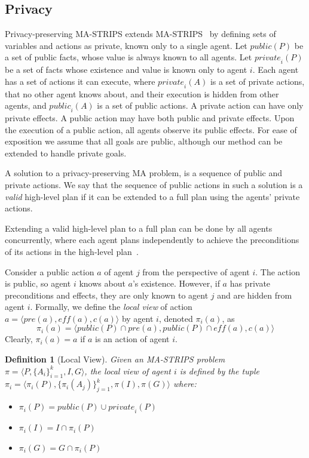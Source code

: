 \documentclass[letterpaper]{article}
\newcommand{\private}[2]{\textit{private}_{#1}(#2)}
\newcommand{\eff}{\textit{eff}}
\newcommand{\pre}{\textit{pre}}
\newcommand{\public}{\textit{public}}
\newtheorem{definition}{Definition}
\theoremstyle{definition}
\begin{document}
\subsection{Privacy}

Privacy-preserving MA-STRIPS extends MA-STRIPS~\cite{brafman2008one} by defining sets of variables and actions as private, known only to a single agent. Let $\public(P)$ be a set of public facts, whose value is always known to all agents. Let $\private{i}{P}$ be a set of facts whose existence and value is known only to agent $i$. Each agent has a set of actions it can execute, where $\private{i}{A}$ is a set of private actions, that no other agent knows about, and their execution is hidden from other agents, and $\public_i(A)$ is a set of public actions. A private action can have only private effects. A public action may have both public and private effects. Upon the execution of a public action, all agents observe its public effects. For ease of exposition we assume that all goals are public, although our method can be extended to handle private goals.

A solution to a privacy-preserving MA problem, is a sequence of public and private actions. We say that the sequence of public actions in such a solution is a {\em valid} high-level plan if it can be extended to a full plan using the agents' private actions.

Extending a valid high-level plan to a full plan can be done by all agents concurrently, where each agent plans independently to achieve the preconditions of its actions in the high-level plan~\cite{maliah2014privacyPreserving}.

Consider a public action $a$ of agent $j$ from the perspective of agent $i$.
The action is public, so agent $i$ knows about $a$'s existence. However, if $a$ has private preconditions and effects, they are only known to agent $j$ and are hidden from agent $i$. Formally, we define the {\em local view} of action $a=\langle \pre(a),\eff(a),c(a) \rangle$ by agent $i$, denoted $\pi_i(a)$, as
\[ \pi_i(a)=\langle \public(P)\cap \pre(a), \public(P)\cap \eff(a), c(a) \rangle \]
Clearly, $\pi_i(a)=a$ if $a$ is an action of agent $i$.



\begin{definition}[Local View]
Given an MA-STRIPS problem $\pi=\langle  P, \{A_i\}_{i=1}^k, I ,G \rangle$,
the {\em local view} of agent $i$ is defined by the tuple
$\pi_i=\langle
\pi_i(P), \{\pi_i(A_j)\}_{j=1}^k,\pi(I),\pi(G)
\rangle
$
where:
\begin{itemize}
\item $\pi_i(P)=\public(P)\cup \private{i}{P}$
\item $\pi_i(I)=I \cap \pi_i(P)$
\item $\pi_i(G)=G \cap \pi_i(P)$
\end{itemize}
\label{def:local-view}
\end{definition}
\end{document}
